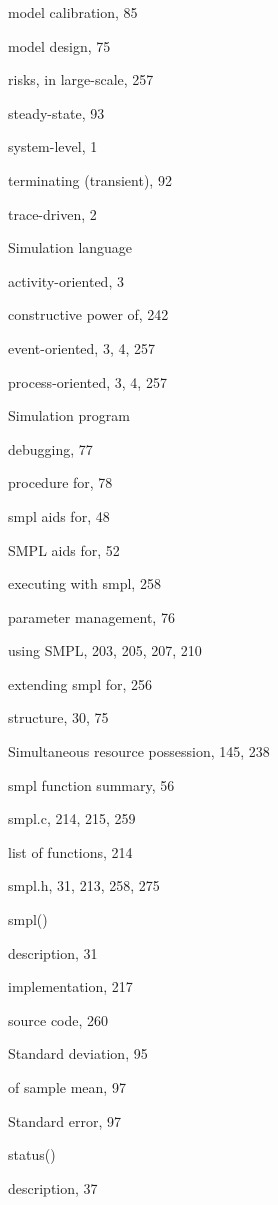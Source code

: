 \quad model calibration, 85\par
\quad model design, 75\par
\quad risks, in large-scale, 257\par
\quad steady-state, 93\par
\quad system-level, 1\par
\quad terminating (transient), 92\par
\quad trace-driven, 2\par
\noindent Simulation language\par
\quad activity-oriented, 3\par
\quad constructive power of, 242\par
\quad event-oriented, 3, 4, 257\par
\quad process-oriented, 3, 4, 257\par
\noindent Simulation program\par
\quad debugging, 77\par
\qquad procedure for, 78\par
\qquad smpl aids for, 48\par
\qquad SMPL aids for, 52\par
\quad executing with smpl, 258\par
\quad parameter management, 76\par
\qquad using SMPL, 203, 205, 207, 210\par
\qquad extending smpl for, 256\par
\quad structure, 30, 75\par
\noindent Simultaneous resource possession, 145, 238\par
\noindent smpl function summary, 56\par
\noindent smpl.c, 214, 215, 259\par
\quad list of functions, 214\par
\noindent smpl.h, 31, 213, 258, 275\par
\noindent smpl()\par
\quad description, 31\par
\quad implementation, 217\par
\quad source code, 260\par
\noindent Standard deviation, 95\par
\quad of sample mean, 97\par
\noindent Standard error, 97\par
\noindent status()\par
\quad description, 37\par
